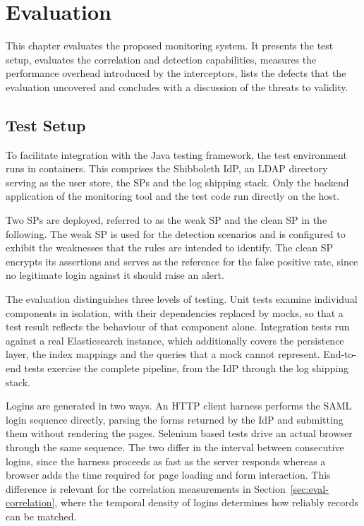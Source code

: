 \documentclass[../main.tex]{subfiles}
\begin{document}
\chapter{Evaluation}\label{ch:evaluation}

This chapter evaluates the proposed monitoring system. 
It presents the test setup, evaluates the correlation and detection capabilities, 
measures the performance overhead introduced by the interceptors, lists the defects that the 
evaluation uncovered and concludes with a discussion of the threats to validity. 

\section{Test Setup}\label{sec:setup}

To facilitate integration with the Java testing framework, the test environment runs in containers. 
This comprises the Shibboleth IdP, an LDAP directory serving as the user store, the SPs and the 
log shipping stack. 
Only the backend application of the monitoring tool and the test code run directly on the host. 

Two SPs are deployed, referred to as the weak SP and the clean SP in the following. 
The weak SP is used for the detection scenarios and is configured to exhibit the weaknesses 
that the rules are intended to identify. 
The clean SP encrypts its assertions and serves as the reference for the false positive rate, 
since no legitimate login against it should raise an alert. 

The evaluation distinguishes three levels of testing. 
Unit tests examine individual components in isolation, with their dependencies replaced by
mocks, so that a test result reflects the behaviour of that component alone. 
Integration tests run against a real Elasticsearch instance, which additionally covers the
persistence layer, the index mappings and the queries that a mock cannot represent. 
End-to-end tests exercise the complete pipeline, from the IdP through the log shipping stack. 

Logins are generated in two ways. 
An HTTP client harness performs the SAML login sequence directly, parsing the forms returned
by the IdP and submitting them without rendering the pages. 
Selenium based tests drive an actual browser through the same sequence. 
The two differ in the interval between consecutive logins, since the harness proceeds as fast 
as the server responds whereas a browser adds the time required for page loading and form 
interaction. 
This difference is relevant for the correlation measurements in Section~\ref{sec:eval-correlation},
where the temporal density of logins determines how reliably records can be matched. 
\end{document}
